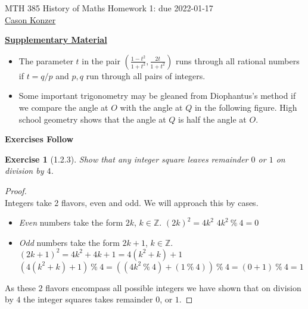 \documentclass[10pt]{article}
\theoremstyle{plain}
\newtheorem{ex}{Exercise}
\begin{document}
MTH 385 \qquad History of Maths \qquad Homework 1: due 2022-01-17 \\
\color{purple}\underline{Cason Konzer}\color{black}

\hrulefill

\underline{\textbf{Supplementary Material}}
\color{blue}

\begin{itemize}
  \item The parameter $t$ in the pair $\displaystyle \left(\frac{1-t^2}{1+t^2},\frac{2t}{1+t^2}\right)$ runs through all rational numbers if $t=q/p$ and $p,q$ run through all pairs of integers.
  \item Some important trigonometry may be gleaned from Diophantus's method if we compare the angle at $O$ with the angle at $Q$ in the following figure. High school geometry shows that the angle at $Q$ is half the angle at $O$.
\end{itemize}

\color{black}

\begin{center}
\end{center}

\hrulefill

\begin{center}
  \textbf{Exercises Follow}
\end{center}

\newpage

\begin{ex} [1.2.3]
  Show that any integer square leaves remainder $0$ or $1$ on division by $4$.
\end{ex}

\begin{proof}
  \ \\
  Integers take 2 flavors, even and odd. We will approach this by cases. 
  \begin{itemize}
    \item \textit{Even} numbers take the form $2k$, $k \in \mathbb{Z} $.
    \subitem $(2k)^{2} = 4k^{2}$ 
    \subitem $4k^{2} \ \% \ {4} = 0$
    \item \textit{Odd} numbers take the form $2k+1$, $k \in \mathbb{Z} $.
    \subitem $(2k+1)^{2} = 4k^{2}+4k+1 = 4(k^{2}+k)+1$
    \subitem $(4(k^{2}+k)+1) \ \% \ {4} = ((4k^{2} \ \% \ {4})+(1 \ \% \ {4})) \ \% \ {4} = (0+1) \ \% \ {4} = 1$
  \end{itemize}
  As these $2$ flavors encompass all possible integers we have shown that on division by $4$ the integer squares takes remainder $0$, or $1$.
\end{proof} 
\end{document}

